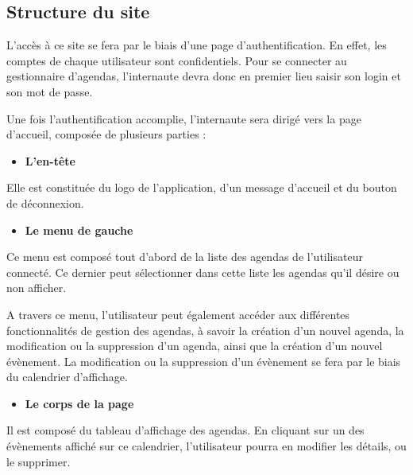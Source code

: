 \documentclass[12pt , a4paper]{article}
\begin{document}
\newpage
\subsection{Structure du site}


L{\textquoteright}acc\`es \`a ce site se fera par le biais
d{\textquoteright}une page d{\textquoteright}authentification. En
effet, les comptes de chaque utilisateur sont confidentiels. Pour se
connecter au gestionnaire d{\textquoteright}agendas,
l{\textquoteright}internaute devra donc en premier lieu saisir son
login et son mot de passe.

\vspace{0.5cm}

\noindent Une fois l{\textquoteright}authentification accomplie,
l{\textquoteright}internaute sera dirig\'e vers la page
d{\textquoteright}accueil, compos\'ee de plusieurs parties :


\begin{itemize}
\item \textbf{L{\textquoteright}en-t\^ete}
\end{itemize}
Elle est constitu\'ee du logo de l{\textquoteright}application,
d{\textquoteright}un message d{\textquoteright}accueil et du bouton de
d\'econnexion.

\vspace{0.5cm}
\begin{itemize}
\item \textbf{Le menu de gauche~}
\end{itemize}
Ce menu est compos\'e tout d{\textquoteright}abord de la liste des
agendas de l{\textquoteright}utilisateur connect\'e. Ce dernier peut
s\'electionner dans cette liste les agendas qu{\textquoteright}il
d\'esire ou non afficher.

\noindent A travers ce menu, l{\textquoteright}utilisateur peut \'egalement
acc\'eder aux diff\'erentes fonctionnalit\'es de gestion des agendas,
\`a savoir la cr\'eation d{\textquoteright}un nouvel agenda, la
modification ou la suppression d{\textquoteright}un agenda, ainsi que
la cr\'eation d{\textquoteright}un nouvel \'ev\`enement. La
modification ou la suppression d{\textquoteright}un \'ev\`enement se
fera par le biais du calendrier d{\textquoteright}affichage.

\vspace{0.5cm}
\begin{itemize}
\item \textbf{Le corps de la page}
\end{itemize}
Il est compos\'e du tableau d{\textquoteright}affichage des agendas. En
cliquant sur un des \'ev\`enements affich\'e sur ce calendrier,
l{\textquoteright}utilisateur pourra en modifier les d\'etails, ou le
supprimer.
\end{document}

